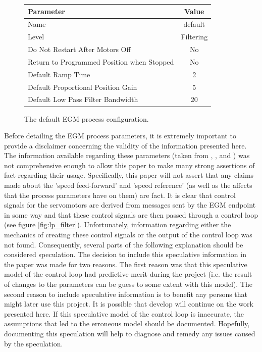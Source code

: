 \documentclass{cslthse-msc}
\begin{document}
\begin{figure}[H]
\vspace{0.5cm}
    \centering
    \begin{tabular}{| l | c |}
    \hline
        \textbf{Parameter} & \textbf{Value} \\ \hline
        Name        &   default \\
        Level       &   Filtering   \\
        Do Not Restart After Motors Off & No    \\
        Return to Programmed Position when Stopped & No \\
        Default Ramp Time & 2   \\
        Default Proportional Position Gain & 5  \\
        Default Low Pass Filter Bandwidth & 20  \\ \hline
    \end{tabular}
    \caption{The default EGM process configuration.}
    \label{fig:process_config}
\end{figure}
\vspace{0.5cm}
Before detailing the EGM process parameters, it is extremely important to provide a disclaimer concerning the validity of the information presented here. The information available regarding these parameters (taken from \cite[Sec. 9.3.2.5]{ABB:controller_software}, \cite[Sec. 9.3.4]{ABB:controller_software}, and \cite[Sec. 6.12]{ABB:system_parameters}) was not comprehensive enough to allow this paper to make many strong assertions of fact regarding their usage. Specifically, this paper will not assert that any claims made about the 'speed feed-forward' and 'speed reference' (as well as the affects that the process parameters have on them) are fact. It is clear that control signals for the servomotors are derived from messages sent by the EGM endpoint in some way and that these control signals are then passed through a control loop (see figure \ref{fig:lp_filter}). Unfortunately, information regarding either the mechanics of creating these control signals or the output of the control loop was not found. Consequently, several parts of the following explanation should be considered speculation. The decision to include this speculative information in the paper was made for two reasons. The first reason was that this speculative model of the control loop had predictive merit during the project (i.e. the result of changes to the parameters can be guess to some extent with this model). The second reason to include speculative information is to benefit any persons that might later use this project. It is possible that develop will continue on the work presented here. If this speculative model of the control loop is inaccurate, the assumptions that led to the erroneous model should be documented. Hopefully, documenting this speculation will help to diagnose and remedy any issues caused by the speculation. \par
\end{document}
